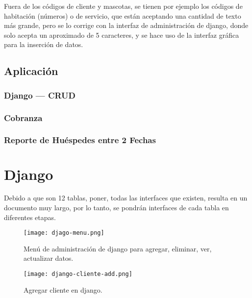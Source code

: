 \documentclass[
  12pt,
  hidelinks,
  a4paper,
  headings=standardclasses,
  headings=big,
  spanish
]{scrartcl}
\begin{document}
Fuera de los códigos de cliente y mascotas, se tienen por ejemplo los códigos de habitación (números) o de servicio, que están aceptando una cantidad de texto más grande, pero se lo corrige con la interfaz de administración de django, donde solo acepta un aproximado de 5 caracteres, y se hace uso de la interfaz gráfica para la inserción de datos.



\pagebreak
\subsection{Aplicación}
\subsubsection{Django --- CRUD}

\subsubsection{Cobranza}



\subsubsection{Reporte de Huéspedes entre 2 Fechas}



\pagebreak
\appendix
\section{Django}

Debido a que son 12 tablas, poner, todas las interfaces que existen, resulta en un documento muy largo, por lo tanto, se pondrán interfaces de cada tabla en diferentes etapas.

\begin{figure}[H]
  \centering
  \texttt{[image: djago-menu.png]}
  \caption[Menú django]{Menú de administración de django para agregar, eliminar, ver, actualizar datos.}
\end{figure}

\begin{figure}[H]
  \centering
  \texttt{[image: django-cliente-add.png]}
  \caption{Agregar cliente en django.}
\end{figure}
\end{document}

